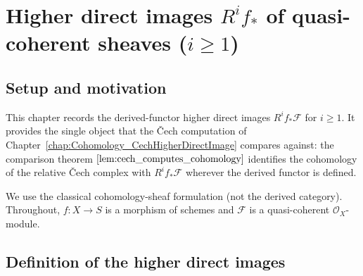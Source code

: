\chapter{Higher direct images $R^i f_*$ of quasi-coherent sheaves ($i \geq 1$)}
\label{chap:Cohomology_HigherDirectImage}

\section{Setup and motivation}

This chapter records the derived-functor higher direct images \(R^i f_*\mathcal{F}\)
for \(i \geq 1\). It provides the single object that the {\v C}ech computation of
Chapter~\ref{chap:Cohomology_CechHigherDirectImage} compares against: the comparison
theorem \(\ref{lem:cech_computes_cohomology}\) identifies the cohomology of the
relative {\v C}ech complex with \(R^i f_*\mathcal{F}\) wherever the derived functor
is defined.

We use the classical cohomology-sheaf formulation (not the derived category).
Throughout, \(f : X \to S\) is a morphism of schemes and \(\mathcal{F}\) is a
quasi-coherent \(\mathcal{O}_X\)-module.

\section{Definition of the higher direct images}

